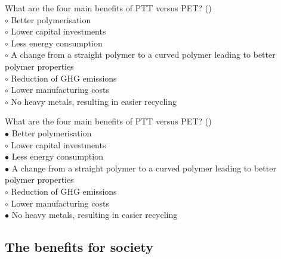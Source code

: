 \documentclass[]{beamer}
\begin{document}
\begin{CJK}{UTF8}{gbsn}
\begin{frame}[shrink] {}
\addtocounter{questions}{1}
\color{blue}
What are the four main benefits of PTT versus PET?
({})\\
\color{black}
\setlength{\parindent}{-0.4cm}
{\color{red}$\circ$}  Better polymerisation   \\
{\color{red}$\circ$} Lower capital investments  \\
{\color{red}$\circ$}  Less energy consumption  \\
{\color{red}$\circ$}  A change from a straight polymer to a curved polymer leading to better polymer properties  \\
{\color{red}$\circ$} Reduction of GHG emissions  \\
{\color{red}$\circ$} Lower manufacturing costs  \\
{\color{red}$\circ$}  No heavy metals, resulting in easier recycling  \\

\end{frame}
\begin{frame}[shrink] {}
\addtocounter{answers}{1}
\color{blue}
What are the four main benefits of PTT versus PET?
({})\\
\color{black}
\setlength{\parindent}{-0.4cm}
{\color{red}$\bullet$} Better polymerisation   \\
{\color{red}$\circ$} Lower capital investments  \\
{\color{red}$\bullet$} Less energy consumption  \\
{\color{red}$\bullet$} A change from a straight polymer to a curved polymer leading to better polymer properties  \\
{\color{red}$\circ$} Reduction of GHG emissions  \\
{\color{red}$\circ$} Lower manufacturing costs  \\
{\color{red}$\bullet$} No heavy metals, resulting in easier recycling  \\

\end{frame}


\subsection{The benefits for society}
\setcounter{questions}{0}
\setcounter{answers}{0}



\end{CJK}
\end{document}
